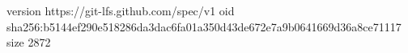version https://git-lfs.github.com/spec/v1
oid sha256:b5144ef290e518286da3dac6fa01a350d43de672e7a9b0641669d36a8ce71117
size 2872
